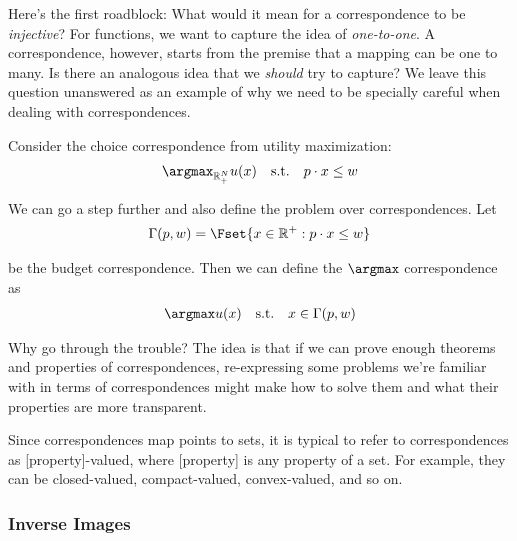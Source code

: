 \documentclass{article}
\begin{document}
Here's the first roadblock: What would it mean for a correspondence to be \textit{injective}? For functions, we want to capture the idea of \textit{one-to-one}. A correspondence, however, starts from the premise that a mapping can be one to many. Is there an analogous idea that we \textit{should} try to capture? We leave this question unanswered as an example of why we need to be specially careful when dealing with correspondences.
\begin{example}
  Consider the choice correspondence from utility maximization:
  \begin{align*}
    \argmax_{\mathbb{R}^N_+} u(x)
    \quad
    \text{s.t.}
    \quad
    p \cdot x \le w
  \end{align*}

  We can go a step further and also define the problem over correspondences. Let
  \begin{align*}
    \Gamma(p, w)
    =
    \Fset{x \in \mathbb{R}^+: p \cdot x \le w}
  \end{align*}

  be the budget correspondence. Then we can define the $\argmax$ correspondence as
  \begin{align*}
    \argmax u(x)
    \quad
    \text{s.t.}
    \quad
    x \in \Gamma(p, w)
  \end{align*}

  Why go through the trouble? The idea is that if we can prove enough theorems and properties of correspondences, re-expressing some problems we're familiar with in terms of correspondences might make how to solve them and what their properties are more transparent.
\end{example}

\begin{remark}
  Since correspondences map points to sets, it is typical to refer to correspondences as [property]-valued, where [property] is any property of a set. For example, they can be closed-valued, compact-valued, convex-valued, and so on.
\end{remark}

\subsubsection{Inverse Images}
\label{ssub:inverse_images}
\end{document}
